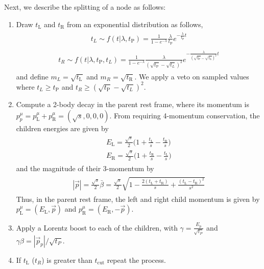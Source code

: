 \documentclass[12pt]{article}
\newcommand{\bea}{\begin{eqnarray}\begin{aligned}}
\newcommand{\eea}{\end{aligned}\end{eqnarray}}
\begin{document}
Next, we describe the splitting of a node as follows:
\begin{enumerate}

\item Draw $ t_{\text{L}}$ and  $t_{\text{R}}$ from an exponential distribution as follows,
\bea \label{eq:exponential1}
t_L \sim f(t | \lambda, t_{\text{P}})=\frac{1}{1-e^{- \lambda}} \frac{\lambda}{t_{\text{P}}} e^{- \frac{\lambda}{ t_{\text{P}}} t} 
\eea
\bea \label{eq:exponential2}
t_R \sim f(t | \lambda, t_{\text{P}}, t_L)= \frac{1}{1-e^{- \lambda}} \frac{\lambda}{ (\sqrt{t_{\text{P}}}-\sqrt{t_L})^2} e^{- \frac{\lambda}{ (\sqrt{t_{\text{P}}}-\sqrt{t_L})^2} t} 
\eea
and  define $m_L=\sqrt{t_\text{L}}$ and $m_R=\sqrt{t_\text{R}}$. We apply a veto on sampled values where $t_L  \geqslant t_{\text{P}}$ and $t_R \geqslant (\sqrt{t_{\text{P}}}-\sqrt{t_L})^2$.


\item Compute a 2-body decay in the parent rest frame, where its momentum is $p^\mu_p=p^\mu_{\text{L}}+p^\mu_{\text{R}}=(\sqrt{s}, 0, 0, 0)$. From requiring 4-momentum conservation, the children energies are given by
\bea
E_{\text{L}}=\frac{\sqrt{s}}{2}\bigg(1+\frac{t_{\text{L}}}{s}-\frac{t_{\text{R}}}{s} \bigg) \\
E_{\text{R}}=\frac{\sqrt{s}}{2}\bigg(1+\frac{t_{\text{R}}}{s}-\frac{t_{\text{L}}}{s} \bigg)
\eea
and the magnitude of their 3-momentum by
\bea\label{eq:Prestframe}
|\vec{p}| =\frac{\sqrt{s}}{2} \bar{\beta}=\frac{\sqrt{s}}{2} \sqrt{1-\frac{2 (t_{\text{L}}+t_{\text{R}})}{s}+\frac{(t_{\text{L}}-t_{\text{R}})^2}{s^2}}
\eea
Thus, in the parent rest frame, the left and right child momentum is given by $p^\mu_\text{L}=(E_{\text{L}},\vec{p})$ and $p^\mu_\text{R}=(E_{\text{R}},-\vec{p})$. 

\item Apply a Lorentz boost to each of the children, with $\gamma=\frac{E_p}{\sqrt{t_P}}$ and $\gamma \beta = |\vec{p}_p|/\sqrt{t_P}$. 

\item If $t_{\text{L}}$ ($t_{R}$) is greater than  $t_\text{cut}$ repeat the process.

\end{enumerate}
\end{document}
